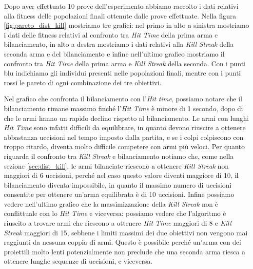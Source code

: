 \documentclass[12pt, italian]{toptesi}
\begin{document}
Dopo aver effettuato 10 prove dell'esperimento abbiamo raccolto i dati relativi alla fitness delle popolazioni finali ottenute dalle prove effettuate.
Nella figura \ref{fig:pareto_dist_kill} mostriamo tre grafici: nel primo in alto a sinistra mostriamo i dati delle fitness relativi al confronto tra \emph{Hit Time} della prima arma e bilanciamento, in alto a destra mostriamo i dati relativi alla \emph{Kill Streak} della seconda arma e del bilanciamento e infine nell'ultimo grafico mostriamo il confronto tra \emph{Hit Time} della prima arma e \emph{Kill Streak} della seconda. Con i punti blu indichiamo gli individui presenti nelle popolazioni finali, mentre con i punti rossi le pareto di ogni combinazione dei tre obiettivi.

Nel grafico che confronta il bilanciamento con l'\emph{Hit time}, possiamo notare che il bilanciamento rimane massimo finché l'\emph{Hit Time} è minore di 1 secondo, dopo di che le armi hanno un rapido declino rispetto al bilanciamento. Le armi con lunghi \emph{Hit Time} sono infatti difficili da equilibrare, in quanto devono riuscire a ottenere abbastanza uccisioni nel tempo imposto dalla partita, e se i colpi colpiscono con troppo ritardo, diventa molto difficile competere con armi più veloci. 
Per quanto riguarda il confronto tra \emph{Kill Streak} e bilanciamento notiamo che, come nella sezione \ref{sec:dist_kill}, le armi bilanciate riescono a ottenere \emph{Kill Streak} non maggiori di 6 uccisioni, perché nel caso questo valore diventi maggiore di 10, il bilanciamento diventa impossibile, in quanto il massimo numero di uccisioni consentite per ottenere un'arma equilibrata è di 10 uccisioni.
Infine possiamo vedere nell'ultimo grafico che la massimizzazione della \emph{Kill Streak} non è conflittuale con lo \emph{Hit Time} e viceversa: possiamo vedere che l'algoritmo è riuscito a trovare armi che riescono a ottenere \emph{Hit Time} maggiori di 8 e \emph{Kill Streak} maggiori di 15, sebbene i limiti massimi dei due obiettivi non vengono mai raggiunti da nessuna coppia di armi.
Questo è possibile perché un'arma con dei proiettili molto lenti potenzialmente non preclude che una seconda arma riesca a ottenere lunghe sequenze di uccisioni, e viceversa.
\end{document}
